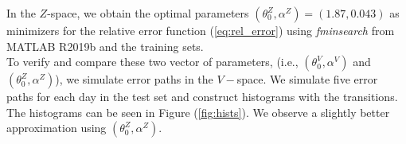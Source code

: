 \documentclass[11pt]{article}
\theoremstyle{definition}
\begin{document}

%


In the $Z$-space, we obtain the optimal parameters $(\theta_0^Z,\alpha^Z)=(1.87,0.043)$ as minimizers for the relative error function (\ref{eq:rel_error}) using \textit{fminsearch} from MATLAB R2019b and the training sets.\\

To verify and compare these two vector of parameters, (i.e., $(\theta_0^V,\alpha^V)$ and $(\theta_0^Z,\alpha^Z)$), we simulate error paths in the $V-$space. We simulate five error paths for each day in the test set and construct histograms with the transitions. The histograms can be seen in Figure (\ref{fig:hists}). We observe a slightly better approximation using $(\theta^Z_0,\alpha^Z)$.
\end{document}
